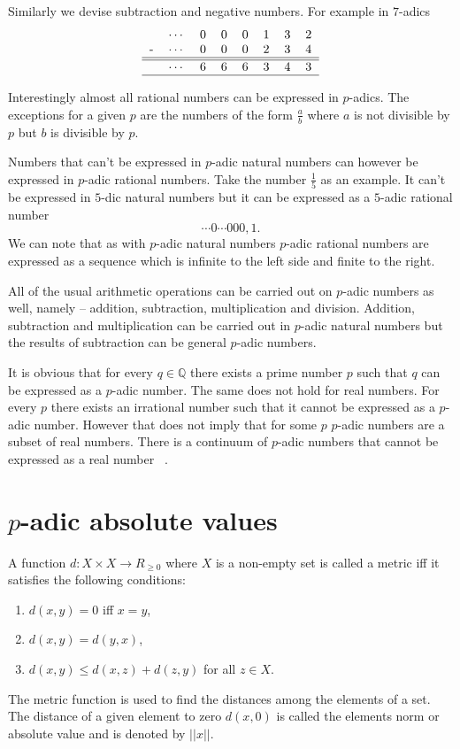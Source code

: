 \documentclass{llncs}
\begin{document}
Similarly we devise subtraction and negative numbers. For example in $7$-adics
\[
\begin{tabular}{rrrrrrrrr|}
&$\cdots$ &0 &0 &0 &1 &3 &2\\
-&$\cdots$ &0 &0 &0 &2 &3 &4\\
\hline
\hline
&$\cdots$ &6 &6 &6 &3 &4 &3\\
\hline
\end{tabular}
\]

Interestingly almost all rational numbers can be expressed in $p$-adics. The exceptions for a given $p$ are the numbers of the form $\frac{a}{b}$  where $a$ is not divisible by $p$ but $b$ is divisible by $p$.

Numbers that can't be expressed in $p$-adic natural numbers can however be expressed in $p$-adic rational numbers. Take the number $\frac{1}{5}$ as an example. It can't be expressed in $5$-dic natural numbers but it can be expressed as a $5$-adic rational number
\[
\cdots 0 \cdots 000,1.
\]
We can note that as with $p$-adic natural numbers $p$-adic rational numbers are expressed as a sequence which is infinite to the left side and finite to the right.

All of the usual arithmetic operations can be carried out on $p$-adic numbers as well, namely -- addition, subtraction, multiplication and division. Addition, subtraction and multiplication can be carried out in $p$-adic natural numbers %
but the results of subtraction can be general $p$-adic numbers.

It is obvious that for every $q \in \mathbb{Q}$ there exists a prime number $p$ such that $q$ can be expressed as a $p$-adic number. The same does not hold for real numbers. For every $p$ there exists an irrational number such that it cannot be expressed as a $p$-adic number. However that does not imply that for some $p$ $p$-adic numbers are a subset of real numbers. There is a continuum of $p$-adic numbers %
that cannot be expressed as a real number ~\citep{Freivalds2012}.

\section{$p$-adic absolute values}
A function $d: X \times X \rightarrow R_{\geq 0}$ where $X$ is a non-empty set is called a metric iff it satisfies the following conditions:
\begin{enumerate}
\item $d(x,y) = 0$ iff $x = y$,
\item $d(x,y) = d(y,x)$,
\item $d(x,y) \leq d(x,z) + d(z,y)$ for all $z \in X$.
\end{enumerate}
The metric function is used to find the distances among the elements of a set. The distance of a given element to zero $d(x,0)$ is called the elements norm or absolute value and is denoted by $||x||$.
\end{document}

